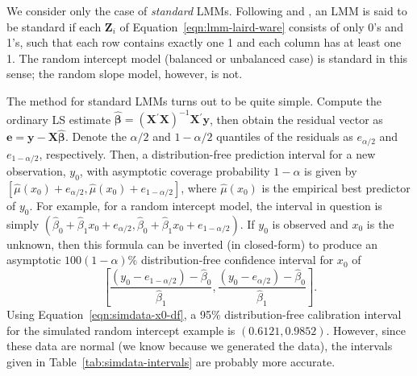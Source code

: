 \documentclass[cmfont,usenames,dvipsnames,leqno]{afit-etd}\usepackage[]{graphicx}\usepackage[]{color}
\newcommand{\trans}{\ensuremath{^\prime}}
\newcommand{\wh}[1]{\ensuremath{\widehat{#1}}}
\newcommand{\X}{\ensuremath{\bm{X}}}
\newcommand{\Z}{\ensuremath{\bm{Z}}}
\begin{document}
We consider only the case of \textit{standard} LMMs. Following \citet{jiang_distribution_2002} and \citet{jiang_linear_2007}, an \ac{LMM} is said to be standard if each $\Z_i$ of Equation~\eqref{eqn:lmm-laird-ware} consists of only 0's and 1's, such that each row contains exactly one 1 and each column has at least one 1. The random intercept model (balanced or unbalanced case) is standard in this sense; the random slope model, however, is not. 

The method for standard LMMs turns out to be quite simple. Compute the ordinary \ac{LS} estimate $\wh{\bm{\beta}} = \left(\X\trans\X\right)^{-1}\X\trans\bm{y}$, then obtain the residual vector as $\bm{e} = \bm{y} - \X\wh{\bm{\beta}}$. Denote the $\alpha/2$ and $1-\alpha/2$ quantiles of the residuals as $e_{\alpha/2}$ and $e_{1-\alpha/2}$, respectively. Then, a distribution-free prediction interval for a new observation, $y_0$, with asymptotic coverage probability $1-\alpha$ is given by
$\left[\wh{\mu}(x_0) + e_{\alpha/2}, \wh{\mu}(x_0) + e_{1-\alpha/2}\right]$, where $\wh{\mu}(x_0)$ is the empirical best predictor of $y_0$. For example, for a random intercept model, the interval in question is simply $\left(\wh{\beta}_0 + \wh{\beta}_1 x_0 + e_{\alpha/2}, \wh{\beta}_0 + \wh{\beta}_1 x_0 + e_{1-\alpha/2}\right)$. If $y_0$ is observed and $x_0$ is the unknown, then this formula can be inverted (in closed-form) to produce an asymptotic $100(1-\alpha)\%$ distribution-free confidence interval for $x_0$ of
\begin{equation} 
\label{eqn:simdata-x0-df}
  \left[ \frac{\left(y_0 - e_{1-\alpha/2}\right) - \wh{\beta}_0}{\wh{\beta}_1}, \frac{\left(y_0 - e_{\alpha/2}\right) - \wh{\beta}_0}{\wh{\beta}_1} \right].
\end{equation}
Using Equation~\eqref{eqn:simdata-x0-df}, a 95\% distribution-free calibration interval for the simulated random intercept example is $(0.6121, 0.9852)$. However, since these data are normal (we know because we generated the data), the intervals given in Table~\ref{tab:simdata-intervals} are probably more accurate. 
\end{document}
